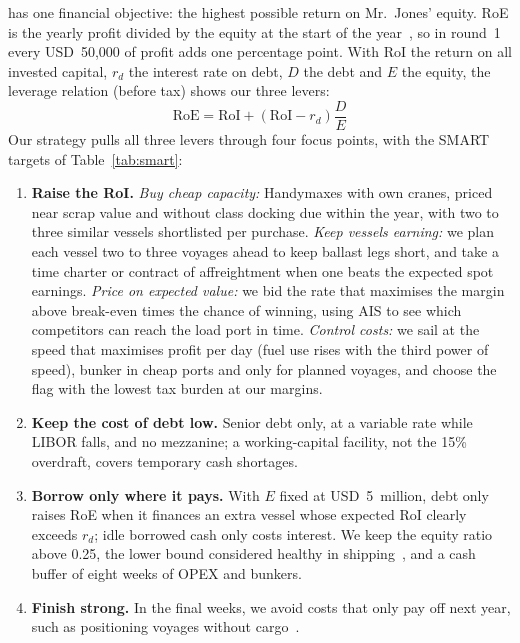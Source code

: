\companyshort{} has one financial objective: the highest possible return on Mr.\ Jones' equity. RoE is the yearly profit divided by the equity at the start of the year~\cite{ShipFinanceLN}, so in round~1 every USD~50,000 of profit adds one percentage point. With RoI the return on all invested capital, $r_d$ the interest rate on debt, $D$ the debt and $E$ the equity, the leverage relation (before tax) shows our three levers:
\begin{equation}
  \text{RoE} = \text{RoI} + \left(\text{RoI} - r_d\right)\frac{D}{E}
  \label{eq:leverage}
\end{equation}
Our strategy pulls all three levers through four focus points, with the SMART targets of Table~\ref{tab:smart}:
\begin{enumerate}
  \item \textbf{Raise the RoI.} \emph{Buy cheap capacity:} Handymaxes with own cranes, priced near scrap value and without class docking due within the year, with two to three similar vessels shortlisted per purchase. \emph{Keep vessels earning:} we plan each vessel two to three voyages ahead to keep ballast legs short, and take a time charter or contract of affreightment when one beats the expected spot earnings. \emph{Price on expected value:} we bid the rate that maximises the margin above break-even times the chance of winning, using AIS to see which competitors can reach the load port in time. \emph{Control costs:} we sail at the speed that maximises profit per day (fuel use rises with the third power of speed), bunker in cheap ports and only for planned voyages, and choose the flag with the lowest tax burden at our margins.
  \item \textbf{Keep the cost of debt low.} Senior debt only, at a variable rate while LIBOR falls, and no mezzanine; a working-capital facility, not the 15\% overdraft, covers temporary cash shortages.
  \item \textbf{Borrow only where it pays.} With $E$ fixed at USD~5~million, debt only raises RoE when it finances an extra vessel whose expected RoI clearly exceeds $r_d$; idle borrowed cash only costs interest. We keep the equity ratio above 0.25, the lower bound considered healthy in shipping~\cite{ShipFinanceLN}, and a cash buffer of eight weeks of OPEX and bunkers.
  \item \textbf{Finish strong.} In the final weeks, we avoid costs that only pay off next year, such as positioning voyages without cargo~\cite{MBGintro}.
\end{enumerate}

